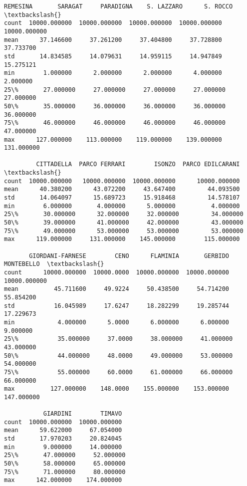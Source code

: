 \documentclass[11pt]{article}
\begin{document}
\begin{tcolorbox}[breakable, size=fbox, boxrule=.5pt, pad at break*=1mm, opacityfill=0]
\begin{Verbatim}[commandchars=\\\{\}]
           REMESINA       SARAGAT     PARADIGNA    S. LAZZARO      S. ROCCO  \textbackslash{}
count  10000.000000  10000.000000  10000.000000  10000.000000  10000.000000
mean      37.146600     37.261200     37.404800     37.728800     37.733700
std       14.834585     14.079631     14.959115     14.947849     15.275121
min        1.000000      2.000000      2.000000      4.000000      2.000000
25\%       27.000000     27.000000     27.000000     27.000000     27.000000
50\%       35.000000     36.000000     36.000000     36.000000     36.000000
75\%       46.000000     46.000000     46.000000     46.000000     47.000000
max      127.000000    113.000000    119.000000    139.000000    131.000000

         CITTADELLA  PARCO FERRARI        ISONZO  PARCO EDILCARANI  \textbackslash{}
count  10000.000000   10000.000000  10000.000000      10000.000000
mean      40.380200      43.072200     43.647400         44.093500
std       14.064097      15.689723     15.918468         14.578107
min        6.000000       4.000000      5.000000          4.000000
25\%       30.000000      32.000000     32.000000         34.000000
50\%       39.000000      41.000000     42.000000         43.000000
75\%       49.000000      53.000000     53.000000         53.000000
max      119.000000     131.000000    145.000000        115.000000

       GIORDANI-FARNESE        CENO      FLAMINIA       GERBIDO    MONTEBELLO  \textbackslash{}
count      10000.000000  10000.0000  10000.000000  10000.000000  10000.000000
mean          45.711600     49.9224     50.438500     54.714200     55.854200
std           16.045989     17.6247     18.282299     19.285744     17.229673
min            4.000000      5.0000      6.000000      6.000000      9.000000
25\%           35.000000     37.0000     38.000000     41.000000     43.000000
50\%           44.000000     48.0000     49.000000     53.000000     54.000000
75\%           55.000000     60.0000     61.000000     66.000000     66.000000
max          127.000000    148.0000    155.000000    153.000000    147.000000

           GIARDINI        TIMAVO
count  10000.000000  10000.000000
mean      59.622000     67.054000
std       17.970203     20.824045
min        9.000000     14.000000
25\%       47.000000     52.000000
50\%       58.000000     65.000000
75\%       71.000000     80.000000
max      142.000000    174.000000
\end{Verbatim}
\end{tcolorbox}
        
\end{document}
